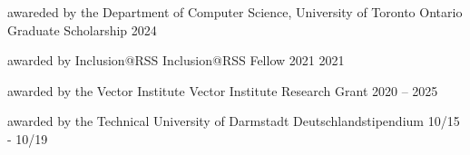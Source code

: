 



\begin{cvhonors}

  \cventry
    {awareded by the Department of Computer Science, University of Toronto} %
    {Ontario Graduate Scholarship} %
    {} %
    {2024} %
    {}

  \cventry
    {awarded by Inclusion@RSS} %
    {Inclusion@RSS Fellow 2021} %
    {} %
    {2021} %
    {}

  \cventry
    {awarded by the Vector Institute} %
    {Vector Institute Research Grant} %
    {} %
    {2020 -- 2025} %
    {}
    
  \cventry
    {awarded by the Technical University of Darmstadt} %
    {Deutschlandstipendium} %
    {} %
    {10/15 - 10/19} %
    {
    }
    
\end{cvhonors}
